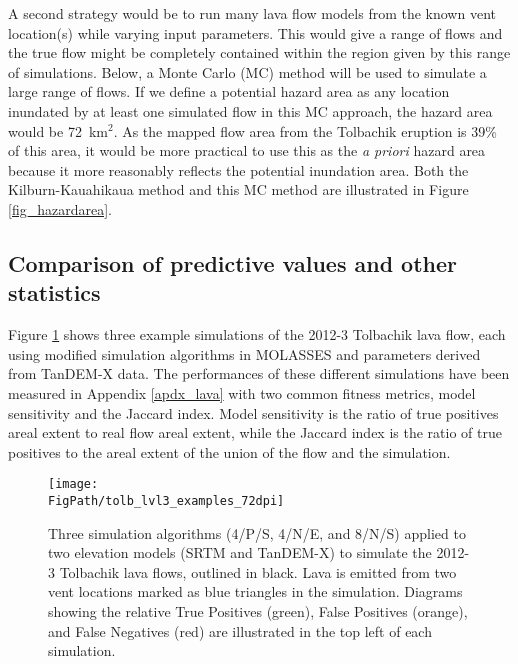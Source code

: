 	A second strategy would be to run many lava flow models from the known vent location(s) while varying input parameters. This would give a range of flows and the true flow might be completely contained within the region given by this range of simulations. Below, a Monte Carlo (MC) method will be used to simulate a large range of flows. If we define a potential hazard area as any location inundated by at least one simulated flow in this MC approach, the hazard area would be 72~km$^2$. As the mapped flow area from the Tolbachik eruption is 39\% of this area, it would be more practical to use this as the \textit{a priori} hazard area because it more reasonably reflects the potential inundation area. Both the Kilburn-Kauahikaua method and this MC method are illustrated in Figure \ref{fig_hazardarea}.				
	
	\subsection{Comparison of predictive values and other statistics}
	Figure \ref{fig_tolbachik} shows three example simulations of the 2012-3 Tolbachik lava flow, each using modified simulation algorithms in MOLASSES and parameters derived from TanDEM-X data. The performances of these different simulations have been measured in Appendix \ref{apdx_lava} with two common fitness metrics, model sensitivity and the Jaccard index. Model sensitivity is the ratio of true positives areal extent to real flow areal extent, while the Jaccard index is the ratio of true positives to the areal extent of the union of the flow and the simulation.	
	
		\begin{figure}[!h]
			\centering
			\texttt{[image: \\FigPath/tolb\_lvl3\_examples\_72dpi]}
			\caption[Three simulation algorithms (4/P/S, 4/N/E, and 8/N/S) applied to two elevation models (SRTM and TanDEM-X) to simulate the 2012-3 Tolbachik lava flows, outlined in black]{Three simulation algorithms (4/P/S, 4/N/E, and 8/N/S) applied to two elevation models (SRTM and TanDEM-X) to simulate the 2012-3 Tolbachik lava flows, outlined in black. Lava is emitted from two vent locations marked as blue triangles in the simulation. Diagrams showing the relative True Positives (green), False Positives (orange), and False Negatives (red) are illustrated in the top left of each simulation.}
			\label{fig_tolbachik}
		\end{figure}
	
